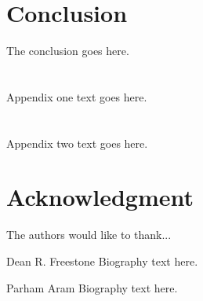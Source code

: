 \documentclass[onecolumn,draftcls]{IEEEtran}
\begin{document}
\section{Conclusion}
The conclusion goes here.

\appendices
\section{}
Appendix one text goes here.

\section{}
Appendix two text goes here.

\section*{Acknowledgment}
The authors would like to thank...

\ifCLASSOPTIONcaptionsoff
  \newpage
\fi








%

\begin{IEEEbiography}{Dean R. Freestone}
Biography text here.
\end{IEEEbiography}

\begin{IEEEbiography}{Parham Aram}
Biography text here.
\end{IEEEbiography}

\end{document}
